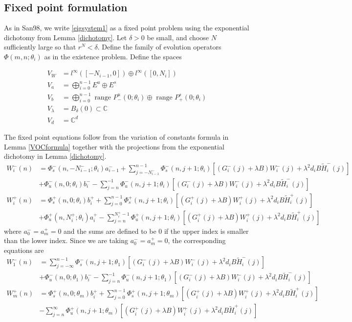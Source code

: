 \documentclass[12pt]{article}
\def\C{{\mathbb C}}
\begin{document}
\subsection{Fixed point formulation}
As in San98, we write \eqref{eigsystem1} as a fixed point problem using the exponential dichotomy from Lemma \ref{dichotomy}. Let $\delta > 0$ be small, and choose $N$ sufficiently large so that $r^N < \delta$. Define the family of evolution operators $\Phi(m, n; \theta_i)$ as in the existence problem. Define the spaces

\begin{align*}
V_W &= l^\infty([-N_{i-1}, 0]) \oplus l^\infty([0, N_i])  \\
V_a &= \bigoplus_{i=0}^{n-1} E^u \oplus E^s \\
V_b &= \bigoplus_{i=0}^{n-1} 
\text{ range } P_-^u(0; \theta_i) \oplus \text{ range } P_+^s(0; \theta_i)\\
V_\lambda &= B_\delta(0) \subset \C \\
V_d &= \C^d
\end{align*}

The fixed point equations follow from the variation of constants formula in Lemma \ref{VOCformula} together with the projections from the exponential dichotomy in Lemma \ref{dichotomy}.
\begin{align*}
W_i^-(n) &= 
\Phi_s^-(n, -N_{i-1}^-; \theta_i) a_{i-1}^- + \sum_{j = -N_{i-1}^-}^{n-1} \Phi_s^-(n, j+1; \theta_i)
[(G_i^-(j) + \lambda B) W_i^-(j) + \lambda^2 d_i B \tilde{H}_i^-(j)]
 \\
&+ \Phi_u^-(n, 0; \theta_i) b_i^- - \sum_{j = n}^{-1} \Phi_u^-(n, j+1; \theta_i) 
[(G_i^-(j) + \lambda B) W_i^-(j) + \lambda^2 d_i B \tilde{H}_i^-(j)] \\
W_i^+(n) &= \Phi_s^+(n, 0; \theta_i) b_i^+ + \sum_{j = 0}^{n-1} \Phi_s^+(n, j+1; \theta_i) 
[(G_i^+(j) + \lambda B) W_i^+(j) + \lambda^2 d_i B \tilde{H}_i^+(j)] \\
&+ \Phi_u^+(n, N_i^+; \theta_i) a_i^+ - \sum_{j = n}^{N_i^+-1} \Phi_u^+(n, j+1; \theta_i) 
[(G_i^+(j) + \lambda B) W_i^+(j) + \lambda^2 d_i B \tilde{H}_i^+(j)]
\end{align*}
where $a_0^- = a_m^+ = 0$ and the sums are defined to be $0$ if the upper index is smaller than the lower index. Since we are taking $a_0^- = a_m^+ = 0$, the corresponding equations are
\begin{align*}
W_1^-(n) &= \sum_{j = -\infty}^{n-1} \Phi_s^-(n, j+1; \theta_1)
[(G_i^-(j) + \lambda B) W_i^-(j) + \lambda^2 d_i B \tilde{H}_i^-(j)]
 \\
&+ \Phi_u^-(n, 0; \theta_1) b_i^- - \sum_{j = n}^{-1} \Phi_u^-(n, j+1; \theta_1) 
[(G_i^-(j) + \lambda B) W_i^-(j) + \lambda^2 d_i B \tilde{H}_i^-(j)] \\
W_m^+(n) &= \Phi_s^+(n, 0; \theta_m) b_i^+ + \sum_{j = 0}^{n-1} \Phi_s^+(n, j+1; \theta_m) 
[(G_i^+(j) + \lambda B) W_i^+(j) + \lambda^2 d_i B \tilde{H}_i^+(j)] \\
&- \sum_{j = n}^{\infty} \Phi_u^+(n, j+1; \theta_m) 
[(G_i^+(j) + \lambda B) W_i^+(j) + \lambda^2 d_i B \tilde{H}_i^+(j)]
\end{align*}
\end{document}
